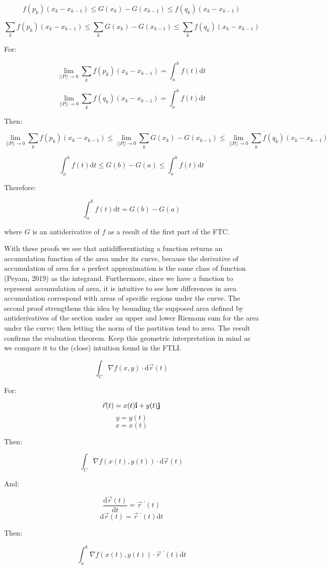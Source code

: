\documentclass[11pt]{article}
\newcommand{\ihat}{\boldsymbol{\hat{\textbf{\i}}}}
\newcommand{\jhat}{\boldsymbol{\hat{\textbf{\j}}}}
\newcommand{\dr}{\vec{r}~^{\prime}(t)}
\begin{document}
$$f(p_k)(x_k-x_{k-1})\leq G(x_k)-G(x_{k-1})\leq f(q_k)(x_k-x_{k-1})$$

$$\sum_k f(p_k)(x_k-x_{k-1})\leq \sum_k G(x_k)-G(x_{k-1})\leq \sum_k f(q_k)(x_k-x_{k-1})$$
\pagebreak
\begin{center}
For:
\end{center}
$$\lim_{||P||\to 0}\sum_k f(p_k)(x_k-x_{k-1}) = \int_{a}^{b}{f(t)\mathrm{d}t}$$

$$\lim_{||P||\to 0}\sum_k f(q_k)(x_k-x_{k-1}) = \int_{a}^{b}{f(t)\mathrm{d}t}$$
\begin{center}
Then:
\end{center}
$$\lim_{||P||\to 0}\sum_k f(p_k)(x_k-x_{k-1})\leq \lim_{||P||\to 0} \sum_k G(x_k)-G(x_{k-1})\leq \lim_{||P||\to 0}\sum_k f(q_k)(x_k-x_{k-1})$$

$$\int_{a}^{b}{f(t)\mathrm{d}t}\leq G(b)-G(a)\leq \int_{a}^{b}{f(t)\mathrm{d}t}$$
\begin{center}
Therefore:
\end{center}
$$\int_{a}^{b}{f(t)\mathrm{d}t} = G(b)-G(a)$$\normalsize

where $G$ is an antiderivative of $f$ as a result of the first part of the FTC.

With these proofs we see that antidifferentiating a function returns an accumulation function of the area under its curve, because the derivative of accumulation of area for a perfect approximation is the same class of function (Peyam, 2019) as the integrand. Furthermore, since we have a function to represent accumulation of area, it is intuitive to see how differences in area accumulation correspond with areas of specific regions under the curve. The second proof strengthens this idea by bounding the supposed area defined by antiderivatives of the section under an upper and lower Riemann sum for the area under the curve; then letting the norm of the partition tend to zero. The result confirms the evaluation theorem. Keep this geometric interpretation in mind as we compare it to the (close) intuition found in the FTLI.

\Large{}$$\int_C \nabla f(x,y)\cdot \mathrm{d}\vec{r}(t)$$
\begin{center}
For:
\end{center}
$$\vec{r}(t)=x(t)\ihat+y(t)\jhat$$
$$y=y(t)$$
$$x=x(t)$$
\begin{center}
Then:
\end{center}
$$\int_C \nabla f(x(t),y(t))\cdot \mathrm{d}\vec{r}(t)$$
\begin{center}
And:
\end{center}
$$\displaystyle{\frac{\mathrm{d}\vec{r}(t)}{\mathrm{d}t}=\dr}$$
$$\mathrm{d}\vec{r}(t)=\dr\mathrm{d}t$$\pagebreak
\begin{center}
Then:
\end{center}
$$\int_a^b \nabla f(x(t),y(t))\cdot \dr\mathrm{d}t$$
\end{document}
